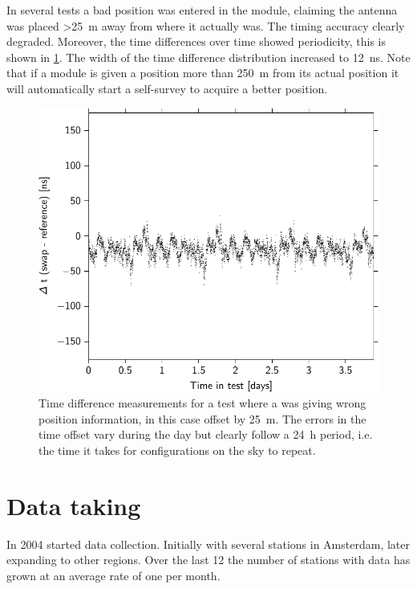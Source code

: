 In several tests a bad position was entered in the \gps module, claiming the \gps antenna was placed \SI{>25}{\meter} away from where it actually was. The timing accuracy clearly degraded. Moreover, the time differences over time showed periodicity, this is shown in \cref{fig:tt_delta_time_022}. The width of the time difference distribution increased to \SI{12}{\ns}. Note that if a \gps module is given a position more than \SI{250}{\meter} from its actual position it will automatically start a self-survey to acquire a better position.

\begin{figure}
    \centering
    \includegraphics{plots/cluster/tt_delta_time_022}
    \caption{Time difference measurements for a test where a \gps was giving wrong position information, in this case offset by \SI{25}{\meter}. The errors in the time offset vary during the day but clearly follow a \SI{24}{\hour} period, i.e. the time it takes for \gps configurations on the sky to repeat.}
    \label{fig:tt_delta_time_022}
\end{figure}


\section{Data taking}

In 2004 \hisparc started data collection. Initially with several stations in Amsterdam, later expanding to other regions. Over the last \SI{12}{\year} the number of stations with data has grown at an average rate of one per month.


